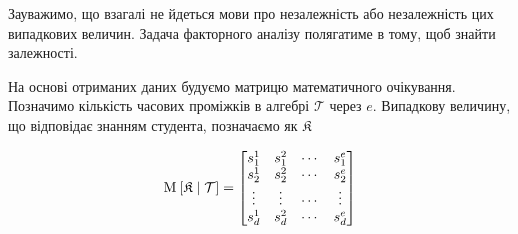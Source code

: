 Зауважимо, що взагалі не йдеться мови про незалежність або незалежність цих
випадкових величин.
Задача факторного аналізу полягатиме в тому, щоб знайти залежності.

На основі отриманих даних будуємо матрицю математичного очікування.
Позначимо кількість часових проміжків в алгебрі $\mathcal{T}$ через $e$.
Випадкову величину, що відповідає знанням студента, позначаємо як $\mathfrak{K}$

\begin{equation*}
  \operatorname{M}_{} \left[ \mathfrak{K} \;\middle|\; \mathcal{T} \right] =
  \begin{bmatrix}
    s_1^1 & s_1^2 & \cdots & s_1^e \\
    s_2^1 & s_2^2 & \cdots & s_2^e \\
    \vdots & \vdots & \cdots & \vdots \\
    s_d^1 & s_d^2 & \cdots & s_d^e \\
  \end{bmatrix}
\end{equation*}
